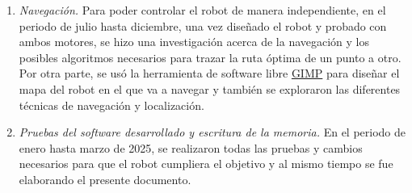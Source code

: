 \begin{enumerate}
 \item \textit{Navegación.} Para poder controlar el robot de manera independiente, en el periodo de julio hasta diciembre, una vez diseñado el robot y probado con ambos motores, se hizo una investigación acerca de la navegación y los posibles algoritmos necesarios para trazar la ruta óptima de un punto a otro. Por otra parte, se usó la herramienta de software libre \hyperlink{GIMP}{GIMP} para diseñar el mapa del robot en el que va a navegar y también se exploraron las diferentes técnicas de navegación y localización.
 
   \item \textit{Pruebas del software desarrollado y escritura de la memoria.} En el periodo de enero hasta marzo de 2025, se realizaron todas las pruebas y cambios necesarios para que el robot cumpliera el objetivo y al mismo tiempo se fue elaborando el presente documento.
\end{enumerate}\

